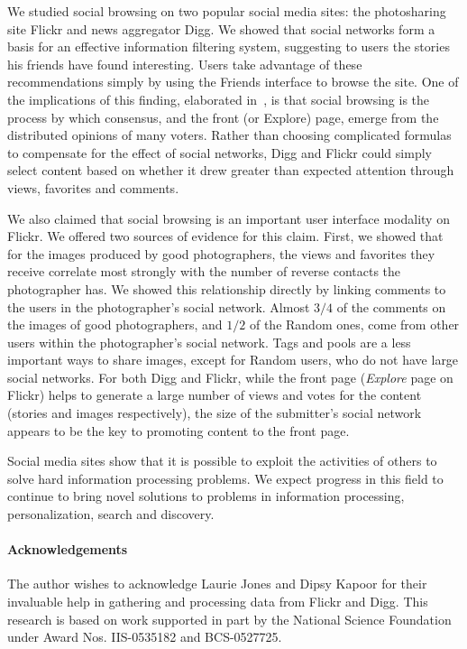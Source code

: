 \documentclass[]{article}
\newcommand{\source}[1]{\textsf{#1}}
\begin{document}
We studied social browsing on two popular social media sites: the photosharing site Flickr
and news aggregator Digg. We showed that social networks
form a basis for an effective information filtering system, suggesting to users the stories his friends
have found interesting. Users take advantage of these
recommendations simply by using the Friends interface to browse the
site. One of the implications of this finding,
elaborated in~\cite{Lerman07ic}, is that social browsing is the process by which
consensus, and the front (or Explore) page, emerge from the distributed opinions of many voters.
Rather than choosing complicated formulas to compensate for the
effect of social networks, Digg and Flickr could simply select
content based on whether it drew greater than expected
attention through views, favorites and comments.


We also claimed that social browsing is an important user interface
modality on Flickr. We offered two sources of evidence for this claim.
First, we showed that for the images produced by good photographers,
the views and favorites they receive correlate most strongly with
the number of reverse contacts the photographer has. We showed this
relationship directly by linking comments to the users in the
photographer's social network. Almost $3/4$ of the comments on the
images of good photographers, and $1/2$ of the \source{Random} ones,
come from other users within the photographer's social network.
Tags and pools are a less important ways to share images, except for \source{Random}
users, who do not have large social networks.
For both Digg and Flickr, while the front page (\emph{Explore} page on
Flickr) helps to
generate a large number of views and votes for the content (stories and images respectively), the
size of the submitter's social network appears to be the key to
promoting content to the front page.


Social media sites show that it is possible to exploit the activities of others
to solve hard information processing problems. We expect progress in this field to
continue to bring novel solutions to problems in information processing, personalization,
search and discovery.


\paragraph{Acknowledgements} The author wishes to acknowledge Laurie
Jones and Dipsy Kapoor for their invaluable help in gathering and
processing data from Flickr and Digg.
This research is based on work supported in part by the National Science
Foundation under Award Nos. IIS-0535182 and BCS-0527725.

\newpage



\end{document}
